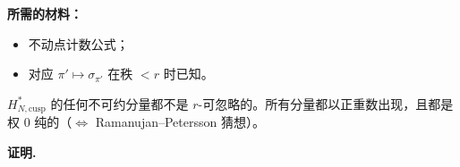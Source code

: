 \par\medskip
\noindent\textbf{所需的材料：}

\begin{itemize}
\item 不动点计数公式；
\item 对应 $\pi' \mapsto \sigma_{\pi'}$ 在秩 $< r$ 时已知。
\end{itemize}

\begin{proposition*}
$H^*_{N,\mathrm{cusp}}$ 的任何不可约分量都不是 $r$-可忽略的。所有分量都以正重数出现，且都是权 $0$ 纯的（$\Leftrightarrow$ Ramanujan--Petersson 猜想）。
\end{proposition*}

\par\medskip
\noindent\textbf{证明.}\


